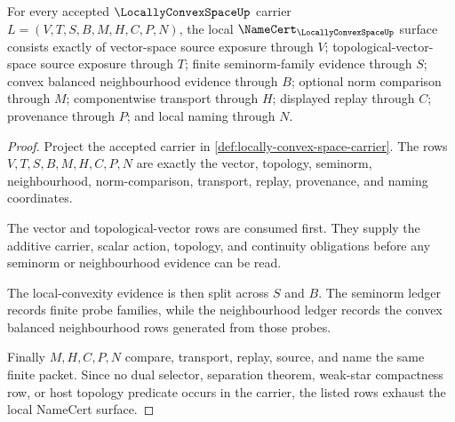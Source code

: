 \begin{theorem}
\label{thm:locally-convex-space-namecert-obligations}
For every accepted $\LocallyConvexSpaceUp$ carrier $L=(V,T,S,B,M,H,C,P,N)$, the local $\NameCert_{\LocallyConvexSpaceUp}$ surface consists exactly of vector-space source exposure through $V$; topological-vector-space source exposure through $T$; finite seminorm-family evidence through $S$; convex balanced neighbourhood evidence through $B$; optional norm comparison through $M$; componentwise transport through $H$; displayed replay through $C$; provenance through $P$; and local naming through $N$.
\end{theorem}
\begin{proof}
Project the accepted carrier in \autoref{def:locally-convex-space-carrier}. The rows $V,T,S,B,M,H,C,P,N$ are exactly the vector, topology, seminorm, neighbourhood, norm-comparison, transport, replay, provenance, and naming coordinates.

The vector and topological-vector rows are consumed first. They supply the additive carrier, scalar action, topology, and continuity obligations before any seminorm or neighbourhood evidence can be read.

The local-convexity evidence is then split across $S$ and $B$. The seminorm ledger records finite probe families, while the neighbourhood ledger records the convex balanced neighbourhood rows generated from those probes.

Finally $M,H,C,P,N$ compare, transport, replay, source, and name the same finite packet. Since no dual selector, separation theorem, weak-star compactness row, or host topology predicate occurs in the carrier, the listed rows exhaust the local NameCert surface.
\end{proof}

